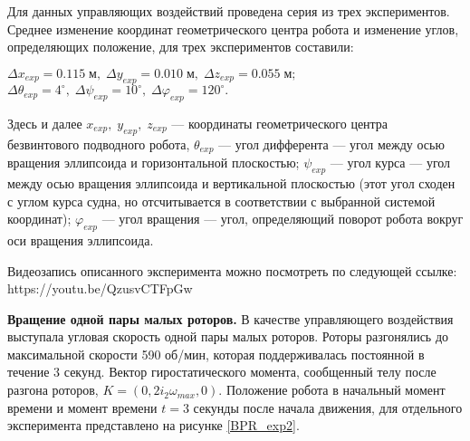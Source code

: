 Для данных управляющих воздействий проведена серия из трех экспериментов. Среднее изменение координат геометрического центра робота и изменение углов, определяющих положение, для трех экспериментов составили:

\begin{center}
$\Delta x_{exp}=0.115 \;\mbox{м},\; \Delta y_{exp}=0.010\; \mbox{м},\; \Delta z_{exp}=0.055\; \mbox{м};$ \\ 
$\Delta \theta_{exp}=4^{\circ},\; \Delta \psi_{exp}=10^{\circ},\; \Delta \varphi_{exp}=120^{\circ}.$
\end{center}

Здесь и далее $x_{exp},\;y_{exp},\;z_{exp}$ --- координаты геометрического центра безвинтового подводного робота, $\theta_{exp}$ --- угол дифферента --- угол между осью вращения эллипсоида и горизонтальной плоскостью; $\psi_{exp}$ --- угол курса --- угол между осью вращения эллипсоида и вертикальной плоскостью (этот угол сходен с углом курса судна, но отсчитывается в соответствии с выбранной системой координат); $\varphi_{exp}$ --- угол вращения --- угол, определяющий поворот робота вокруг оси вращения эллипсоида.

Видеозапись описанного эксперимента можно посмотреть по следующей ссылке: https://youtu.be/QzusvCTFpGw

%


\textbf{Вращение одной пары малых роторов.} В качестве управляющего воздействия выступала угловая скорость одной пары малых роторов. Роторы разгонялись до максимальной скорости 590 об/мин, которая поддерживалась постоянной в течение 3 секунд. Вектор гиростатического момента, сообщенный телу после разгона роторов, $K = (0, 2i_2\omega_{max}, 0)$. Положение робота в начальный момент времени и момент времени $t=3$ секунды после начала движения, для отдельного эксперимента представлено на рисунке \ref{BPR_exp2}.


